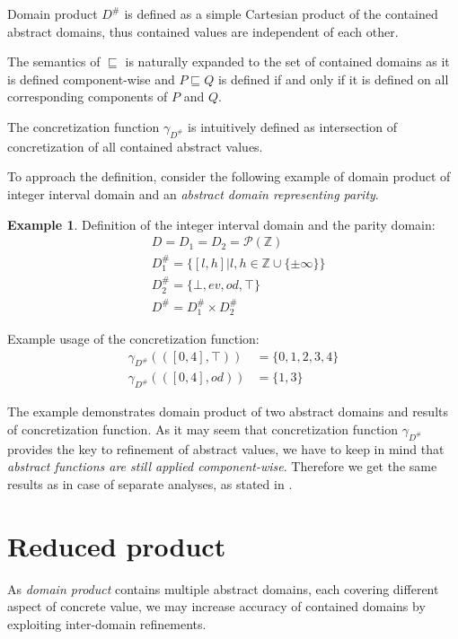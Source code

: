 \documentclass[12pt,oneside]{fithesis2}
\theoremstyle{definition}
\newtheorem{exmp}{Example}[section]
\begin{document}
Domain product $D^\#$ is defined as a simple Cartesian product of the contained abstract domains, thus contained values are independent of each other.

The semantics of $\sqsubseteq$ is naturally expanded to the set of contained domains as it is defined component-wise and $P \sqsubseteq Q$ is defined if and only if it is defined on all corresponding components of $P$ and $Q$.

The concretization function $\gamma_{D^\#}$ is intuitively defined as intersection of concretization of all contained abstract values.

To approach the definition, consider the following example of domain product of integer interval domain and an \textit{abstract domain representing parity}.

\begin{exmp}\label{exmp:domain-product}
  Definition of the integer interval domain and the parity domain:
  \begin{align*}
    &D = D_1 = D_2 = \mathcal P(\mathbb Z)\\
    &D^\#_1 = \{[l,h] | l,h \in \mathbb{Z} \cup \{\pm\infty\}\}\\
    &D^\#_2 = \{\bot, ev, od, \top\}\\
    &D^\# = D^\#_1 \times D^\#_2
  \end{align*}

  Example usage of the concretization function:
  \begin{align*}
    \gamma_{D^\#}(\left( [0, 4], \top \right)) &= \{0,1,2,3,4\}\\
    \gamma_{D^\#}(\left( [0, 4], od \right)) &= \{1,3\}
  \end{align*}
\end{exmp}

The example demonstrates domain product of two abstract domains and results of concretization function. As it may seem that concretization function $\gamma_{D^\#}$ provides the key to refinement of abstract values, we have to keep in mind that \textit{abstract functions are still applied component-wise}. Therefore we get the same results as in case of separate analyses, as stated in \cite{CousotCousot79-1}.

\section{Reduced product}\label{sec:reduced-cardinality-product}

As \textit{domain product} contains multiple abstract domains, each covering different aspect of concrete value, we may increase accuracy of contained domains by exploiting inter-domain refinements.
\end{document}

